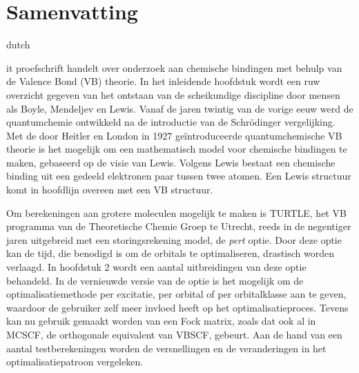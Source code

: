 \chapter*{Samenvatting}
\label{samenvatting}
\fancyhead[RO]{\thepage}
\fancyhead[LE]{\thepage}
\begin{otherlanguage*}{dutch}

\lettrine{}{}it proefschrift handelt over onderzoek aan chemische bindingen met behulp van de Valence Bond (VB) theorie. In het inleidende hoofdstuk wordt een ruw overzicht gegeven van het ontstaan van de scheikundige discipline door mensen als Boyle, Mendeljev en Lewis. Vanaf de jaren twintig van de vorige eeuw werd de quantumchemie ontwikkeld na de introductie van de Schr\"{o}dinger vergelijking. Met de door Heitler en London in 1927 ge\"{i}ntroduceerde quantumchemische VB theorie is het mogelijk om een mathematisch model voor chemische bindingen te maken, gebaseerd op de visie van Lewis. Volgens Lewis bestaat een chemische binding uit een gedeeld elektronen paar tussen twee atomen. Een Lewis structuur komt in hoofdlijn overeen met een VB structuur.

Om berekeningen aan grotere moleculen mogelijk te maken is TURTLE, het VB programma van de Theoretische Chemie Groep te Utrecht, reeds in de negentiger jaren uitgebreid met een storingsrekening model, de \textit{pert} optie. Door deze optie kan de tijd, die benodigd is om de orbitals te optimaliseren, drastisch worden verlaagd. In hoofdstuk 2 wordt een aantal uitbreidingen van deze optie behandeld. In de vernieuwde versie van de optie is het mogelijk om de optimalisatiemethode per excitatie, per orbital of per orbitalklasse aan te geven, waardoor de gebruiker zelf meer invloed heeft op het optimalisatieproces. Tevens kan nu gebruik gemaakt worden van een Fock matrix, zoals dat ook al in MCSCF, de orthogonale equivalent van VBSCF, gebeurt. Aan de hand van een aantal testberekeningen worden de versnellingen en de veranderingen in het optimalisatiepatroon vergeleken.


\end{otherlanguage*}
